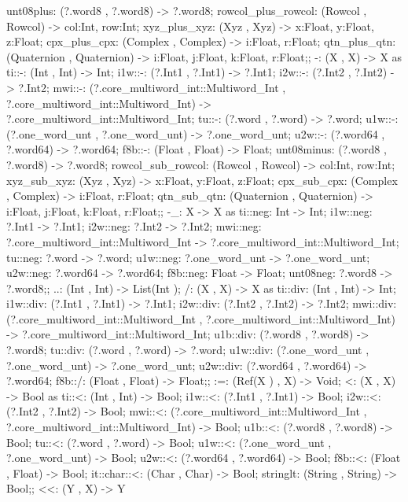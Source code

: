     unt08plus: (?.word8 , ?.word8) -> ?.word8;
    rowcol_plus_rowcol: (Rowcol , Rowcol) -> {col:Int, row:Int};
    xyz_plus_xyz: (Xyz , Xyz) -> {x:Float, y:Float, z:Float};
    cpx_plus_cpx: (Complex , Complex) -> {i:Float, r:Float};
    qtn_plus_qtn: (Quaternion , Quaternion) -> {i:Float, j:Float, k:Float, r:Float};;
-:
(X , X) -> X
as  ti::-: (Int , Int) -> Int;
    i1w::-: (?.Int1 , ?.Int1) -> ?.Int1;
    i2w::-: (?.Int2 , ?.Int2) -> ?.Int2;
    mwi::-:
        (?.core_multiword_int::Multiword_Int , ?.core_multiword_int::Multiword_Int)
        ->
        ?.core_multiword_int::Multiword_Int;
    tu::-: (?.word , ?.word) -> ?.word;
    u1w::-: (?.one_word_unt , ?.one_word_unt) -> ?.one_word_unt;
    u2w::-: (?.word64 , ?.word64) -> ?.word64;
    f8b::-: (Float , Float) -> Float;
    unt08minus: (?.word8 , ?.word8) -> ?.word8;
    rowcol_sub_rowcol: (Rowcol , Rowcol) -> {col:Int, row:Int};
    xyz_sub_xyz: (Xyz , Xyz) -> {x:Float, y:Float, z:Float};
    cpx_sub_cpx: (Complex , Complex) -> {i:Float, r:Float};
    qtn_sub_qtn: (Quaternion , Quaternion) -> {i:Float, j:Float, k:Float, r:Float};;
-_:
X -> X
as  ti::neg: Int -> Int;
    i1w::neg: ?.Int1 -> ?.Int1;
    i2w::neg: ?.Int2 -> ?.Int2;
    mwi::neg: ?.core_multiword_int::Multiword_Int -> ?.core_multiword_int::Multiword_Int;
    tu::neg: ?.word -> ?.word;
    u1w::neg: ?.one_word_unt -> ?.one_word_unt;
    u2w::neg: ?.word64 -> ?.word64;
    f8b::neg: Float -> Float;
    unt08neg: ?.word8 -> ?.word8;;
..: (Int , Int) -> List(Int );
/:
(X , X) -> X
as  ti::div: (Int , Int) -> Int;
    i1w::div: (?.Int1 , ?.Int1) -> ?.Int1;
    i2w::div: (?.Int2 , ?.Int2) -> ?.Int2;
    mwi::div:
        (?.core_multiword_int::Multiword_Int , ?.core_multiword_int::Multiword_Int)
        ->
        ?.core_multiword_int::Multiword_Int;
    u1b::div: (?.word8 , ?.word8) -> ?.word8;
    tu::div: (?.word , ?.word) -> ?.word;
    u1w::div: (?.one_word_unt , ?.one_word_unt) -> ?.one_word_unt;
    u2w::div: (?.word64 , ?.word64) -> ?.word64;
    f8b::/: (Float , Float) -> Float;;
:=: (Ref(X ) , X) -> Void;
<:
(X , X) -> Bool
as  ti::<: (Int , Int) -> Bool;
    i1w::<: (?.Int1 , ?.Int1) -> Bool;
    i2w::<: (?.Int2 , ?.Int2) -> Bool;
    mwi::<: (?.core_multiword_int::Multiword_Int , ?.core_multiword_int::Multiword_Int) -> Bool;
    u1b::<: (?.word8 , ?.word8) -> Bool;
    tu::<: (?.word , ?.word) -> Bool;
    u1w::<: (?.one_word_unt , ?.one_word_unt) -> Bool;
    u2w::<: (?.word64 , ?.word64) -> Bool;
    f8b::<: (Float , Float) -> Bool;
    it::char::<: (Char , Char) -> Bool;
    stringlt: (String , String) -> Bool;;
<<:
(Y , X) -> Y
